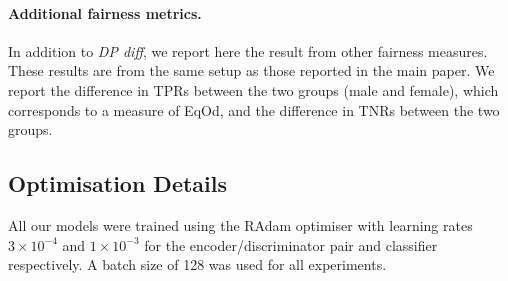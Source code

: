 \begin{table}[tbp]
    \caption{
        Additional fairness metrics for the experiments on the CelebA dataset
        (Fig.~\ref{fig:celeba-multiplot} from the main text). \emph{TPR diff.}\ refers to the
        difference in true positive rate. \emph{TNR diff.}\ refers to the difference in true
        negative rate. \textsc{Left:} $\eta = 0$. \textsc{Right:} $\eta=1$.
    }
    \label{tab:my_label}
\hfill
{}
\end{table}
\paragraph{Additional fairness metrics.}
%
In addition to \emph{DP diff}, we report here the result from other fairness measures. 
%
These results are from the same setup as those reported in the main paper. 
%
We report the difference in \acp{TPR} between the two groups (male and female), which corresponds
to a measure of \acf{EqOd}, and the difference in \acp{TNR} between the two groups.

\subsection{Optimisation Details}\label{sec:nifr-optimisation-details}
%
\noindent All our models were trained using the RAdam optimiser \citep{liu2019variance} with
learning rates $3\times10^{-4}$ and $1\times10^{-3}$ for the encoder/discriminator pair and
classifier respectively. 
%
A batch size of 128 was used for all experiments.

